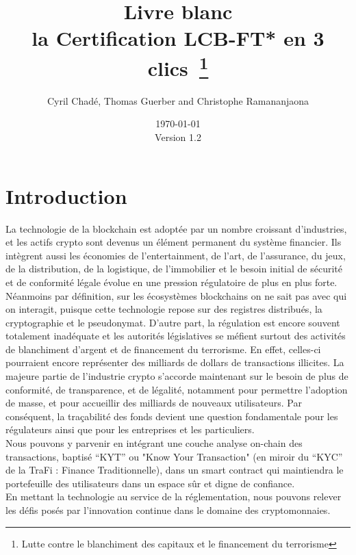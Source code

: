﻿\documentclass[a4paper]{article}
\newcommand{\version}{\vspace{10pt}\\ Version 1.2}
\begin{document}
\title{Livre blanc \vspace{10pt} \\
\large la Certification LCB-FT* en 3 clics~\footnote{Lutte contre le blanchiment des capitaux et le financement du terrorisme}}
\author{Cyril Chad\'e, Thomas Guerber and Christophe Ramananjaona}
\date{\today\version}
\maketitle
\thispagestyle{fancy}
\tableofcontents
\newpage
\section{Introduction}

La technologie de la blockchain est adoptée par un nombre croissant d’industries, et les actifs crypto sont devenus un élément permanent du système financier. Ils intègrent aussi les économies de l’entertainment, de l’art, de l’assurance, du jeux, de la distribution, de la logistique, de l’immobilier et le besoin initial de sécurité et de conformité légale évolue en une pression régulatoire de plus en plus forte. 
Néanmoins par définition, sur les écosystèmes blockchains on ne sait pas avec qui on interagit, puisque cette technologie repose sur des registres distribués, la cryptographie et le pseudonymat. D’autre part, la régulation est encore souvent totalement inadéquate et les autorités législatives se méfient surtout des activités de blanchiment d’argent et de financement du terrorisme. En effet, celles-ci pourraient encore représenter des milliards de dollars de transactions illicites.
La majeure partie de l’industrie crypto s’accorde maintenant sur le besoin de plus de conformité, de transparence, et de légalité, notamment pour permettre l’adoption de masse, et pour accueillir des milliards de nouveaux utilisateurs. Par conséquent, la traçabilité des fonds devient une question fondamentale pour les régulateurs ainsi que pour les entreprises et les particuliers. \\

Nous pouvons y parvenir en intégrant une couche analyse on-chain des transactions, baptisé “KYT” ou "Know Your Transaction" (en miroir du “KYC” de la TraFi : Finance Traditionnelle), dans un smart contract qui maintiendra le portefeuille des utilisateurs dans un espace sûr et digne de confiance. \\

En mettant la technologie au service de la réglementation, nous pouvons relever les défis posés par l'innovation continue dans le domaine des cryptomonnaies. \\
\end{document}
